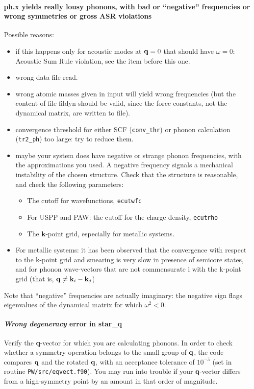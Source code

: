\documentclass[12pt,a4paper]{article}
\begin{document}
\paragraph{ph.x yields really lousy phonons, with bad or ``negative''
  frequencies or wrong symmetries or gross ASR violations} 
Possible reasons:
\begin{itemize}
\item if this happens only for acoustic modes at ${\bf q}=0$ that should
  have $\omega=0$: Acoustic Sum Rule violation, see the item before
  this one.
\item wrong data file read.
\item wrong atomic masses given in input will yield wrong frequencies
  (but the content of file fildyn should be valid, since the force
  constants, not the dynamical matrix, are written to file). 
\item convergence threshold for either SCF (\texttt{conv\_thr}) or phonon
  calculation (\texttt{tr2\_ph}) too large: try to reduce them. 
\item maybe your system does have negative or strange phonon
  frequencies, with the approximations you used. A negative frequency
  signals a mechanical instability of the chosen structure. Check that
  the structure is reasonable, and check the following parameters: 
\begin{itemize}
\item The cutoff for wavefunctions, \texttt{ecutwfc}
\item For USPP and PAW: the cutoff for the charge density, \texttt{ecutrho}
\item The {\bf k}-point grid, especially for metallic systems.
\end{itemize}
\item For metallic systems: it has been observed that the convergence with
  respect to the k-point grid and smearing is very slow in presence of
  semicore states, and for phonon wave-vectors that are not commensurate i
  with the k-point grid (that is, ${\bf q}\ne {\bf k}_i-{\bf k}_j$)
\end{itemize}
Note that ``negative'' frequencies are actually imaginary: the negative
sign flags eigenvalues of the dynamical matrix for which $\omega^2 <
0$. 

\paragraph{{\em Wrong degeneracy} error in star\_q}
Verify the {\bf q}-vector for which you are calculating phonons. In order to
check whether a symmetry operation belongs to the small group of ${\bf q}$,
the code compares ${\bf q}$ and the rotated ${\bf q}$, with an acceptance tolerance of  
$10^{-5}$ (set in routine \texttt{PW/src/eqvect.f90}). You may run into trouble if
your {\bf q}-vector differs from a high-symmetry point by an amount in that
order of magnitude.
\end{document}
